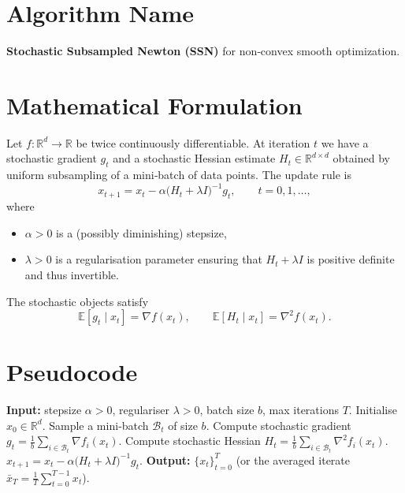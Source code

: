 \documentclass{article}
\newcommand{\EE}{\mathbb{E}}
\newcommand{\RR}{\mathbb{R}}
\begin{document}
\section*{Algorithm Name}
\textbf{Stochastic Subsampled Newton (SSN)} for non‑convex smooth optimization.

\section*{Mathematical Formulation}
Let $f:\RR^{d}\rightarrow\RR$ be twice continuously differentiable.
At iteration $t$ we have a stochastic gradient $g_t$ and a stochastic
Hessian estimate $H_t\in\RR^{d\times d}$ obtained by uniform subsampling
of a mini‑batch of data points.  The update rule is
\begin{equation}
\boxed{
x_{t+1}=x_t-\alpha\bigl(H_t+\lambda I\bigr)^{-1}g_t},
\qquad t=0,1,\dots ,
\label{eq:update}
\end{equation}
where
\begin{itemize}
\item $\alpha>0$ is a (possibly diminishing) stepsize,
\item $\lambda>0$ is a regularisation parameter ensuring that $H_t+\lambda I$
  is positive definite and thus invertible.
\end{itemize}
The stochastic objects satisfy
\[
\EE[g_t\mid x_t]=\nabla f(x_t),\qquad
\EE[H_t\mid x_t]=\nabla^2 f(x_t).
\]

\section*{Pseudocode}
\begin{algorithm}[H]
\caption{Stochastic Subsampled Newton (SSN)}
\begin{algorithmic}[1]
\STATE \textbf{Input:} stepsize $\alpha>0$, regulariser $\lambda>0$, 
batch size $b$, max iterations $T$.
\STATE Initialise $x_0\in\RR^{d}$.
    \STATE Sample a mini‑batch $\mathcal{B}_t$ of size $b$.
    \STATE Compute stochastic gradient
          $g_t=\frac{1}{b}\sum_{i\in\mathcal{B}_t}\nabla f_i(x_t)$.
    \STATE Compute stochastic Hessian
          $H_t=\frac{1}{b}\sum_{i\in\mathcal{B}_t}\nabla^2 f_i(x_t)$.
    \STATE $x_{t+1}=x_t-\alpha\bigl(H_t+\lambda I\bigr)^{-1}g_t$.
\ENDFOR
\STATE \textbf{Output:} $\{x_t\}_{t=0}^{T}$ (or the averaged iterate
$\bar x_T=\frac1T\sum_{t=0}^{T-1}x_t$).
\end{algorithmic}
\end{algorithm}
\end{document}
